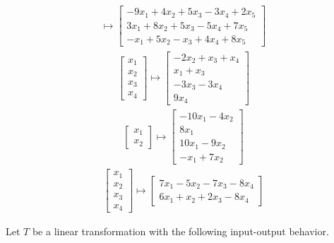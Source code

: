 \begin{tasks}[style=enumerate]
\begin{align*}
    \mapsto
    \begin{bmatrix}
      -9x_{1} + 4x_{2} + 5x_{3} - 3x_{4} + 2x_{5} \\
      3x_{1} + 8x_{2} + 5x_{3} - 5x_{4} + 7x_{5} \\
      -x_{1} + 5x_{2} - x_{3} + 4x_{4} + 8x_{5}
    \end{bmatrix}
  \end{align*}
\task
  \begin{align*}
    \begin{bmatrix}
      x_1 \\ x_2 \\ x_3 \\ x_4
    \end{bmatrix}
    \mapsto
    \begin{bmatrix}
      -2x_2 + x_3 + x_4 \\ x_1 + x_3 \\ -3x_3 - 3x_4 \\ 9x_4
    \end{bmatrix}
  \end{align*}
\task
  \begin{align*}
    \left[\begin{matrix}x_{1}\\x_{2}\end{matrix}\right]
    \mapsto
    \begin{bmatrix}- 10 x_{1} - 4 x_{2} \\8 x_{1} \\10 x_{1} - 9 x_{2} \\- x_{1} + 7 x_{2}\end{bmatrix}
  \end{align*}
\task
  \begin{align*}
    \left[\begin{matrix}x_{1}\\x_{2}\\x_{3}\\x_{4}\end{matrix}\right]
    \mapsto
    \begin{bmatrix}7 x_{1} - 5 x_{2} - 7 x_{3} - 8 x_{4} \\6 x_{1} + x_{2} + 2 x_{3} - 8 x_{4}\end{bmatrix}
  \end{align*}
\end{tasks}
Let $T$ be a linear transformation with the following input-output
behavior.
